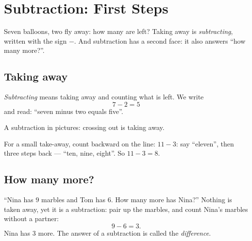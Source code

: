 \chapter{Subtraction: First Steps}\label{ch:g1:subtraction}

Seven balloons, two fly away: how many are left? Taking away is
\emph{subtracting}, written with the sign $-$. And subtraction has a
second face: it also answers ``how many more?''.

\section{Taking away}

\begin{definition}[Subtraction]\label{def:g1:subtraction:def}
\emph{Subtracting} means taking away and counting what is left. We
write
\[
7 - 2 = 5
\]
and read: ``seven minus two equals five''.
\end{definition}

\begin{omfigure}

{\small A subtraction in pictures: crossing out is taking away.}
\end{omfigure}

\begin{example}\label{ex:g1:subtraction:countback}
For a small take-away, count backward on the line: $11 - 3$: say
``eleven'', then three steps back --- ``ten, nine, eight''. So
$11 - 3 = 8$.
\end{example}

\section{How many more?}

\begin{example}\label{ex:g1:subtraction:difference}
``Nina has $9$ marbles and Tom has $6$. How many more has Nina?''
Nothing is taken away, yet it is a subtraction: pair up the marbles,
and count Nina's marbles without a partner:
\[
9 - 6 = 3 .
\]
Nina has $3$ more. The answer of a subtraction is called the
\emph{difference}.
\end{example}

